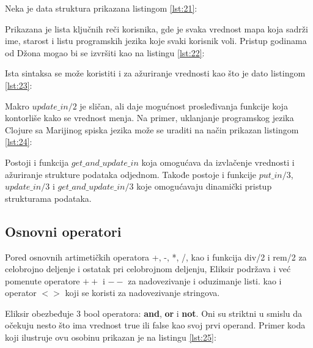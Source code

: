 \documentclass[12pt,oneside]{memoir}
\begin{document}
Neka je data struktura prikazana listingom \ref{lst:21}:



Prikazana je lista ključnih reči korisnika, gde je svaka vrednost mapa koja sadrži ime, starost i listu programskih jezika koje svaki korisnik voli. Pristup godinama od Džona mogao bi se izvršiti kao na listingu \ref{lst:22}:



Ista sintaksa se može koristiti i za ažuriranje vrednosti kao što je dato listingom \ref{lst:23}:



Makro $update\_in/2$ je sličan, ali daje mogućnost prosleđivanja funkcije koja kontorliše kako se vrednost menja. Na primer, uklanjanje programskog jezika Clojure sa Marijinog spiska jezika može se uraditi na način prikazan listingom \ref{lst:24}:



Postoji i funkcija $get\_and\_update\_in$ koja omogućava da izvlačenje vrednosti i ažuriranje strukture podataka odjednom. Takođe postoje i funkcije $put\_in/3$, $update\_in/3$ i $get\_and\_update\_in/3$ koje omogućavaju dinamički pristup strukturama podataka.

\newpage

\subsection{Osnovni operatori}

Pored osnovnih artimetičkih operatora +, -, *, /, kao i funkcija div/2 i rem/2 za celobrojno deljenje i ostatak pri celobrojnom deljenju, Eliksir podržava i već pomenute operatore $++$ i $--$ za nadovezivanje i oduzimanje listi. kao i operator $<>$ koji se koristi za nadovezivanje stringova.

Eliksir obezbeđuje 3 bool operatora: \textbf{and}, \textbf{or} i \textbf{not}. Oni su striktni u smislu da očekuju nesto što ima vrednost true ili false kao svoj prvi operand. Primer koda koji ilustruje ovu osobinu prikazan je na listingu \ref{lst:25}:


\end{document}
